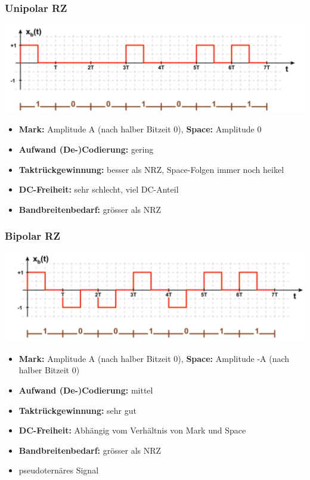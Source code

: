 \subsubsection{Unipolar RZ}
\begin{center}
	\includegraphics[width=0.6\columnwidth]{Images/urz}
\end{center}
\begin{itemize}[nosep]
	\item \textbf{Mark:} Amplitude A (nach halber Bitzeit 0), \textbf{Space:} Amplitude 0
	\item \textbf{Aufwand (De-)Codierung:} gering
	\item \textbf{Taktrückgewinnung:} besser als NRZ, Space-Folgen immer noch heikel
	\item \textbf{DC-Freiheit:} sehr schlecht, viel DC-Anteil
	\item \textbf{Bandbreitenbedarf:} grösser als NRZ
\end{itemize}

\subsubsection{Bipolar RZ}
\begin{center}
	\includegraphics[width=0.6\columnwidth]{Images/brz}
\end{center}
	\begin{itemize}[nosep]
	\item \textbf{Mark:} Amplitude A (nach halber Bitzeit 0), \textbf{Space:} Amplitude -A (nach halber Bitzeit 0)
	\item \textbf{Aufwand (De-)Codierung:} mittel
	\item \textbf{Taktrückgewinnung:} sehr gut
	\item \textbf{DC-Freiheit:} Abhängig vom Verhältnis von Mark und Space
	\item \textbf{Bandbreitenbedarf:} grösser als NRZ
	\item pseudoternäres Signal
\end{itemize}

